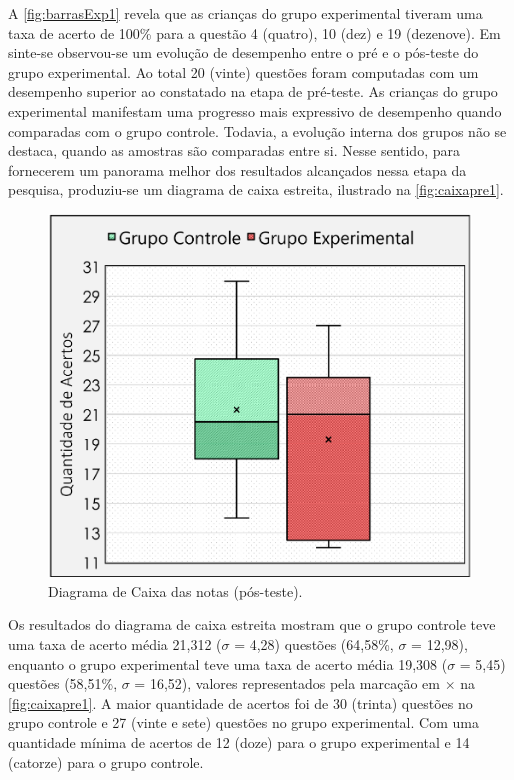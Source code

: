 A \autoref{fig:barrasExp1} revela que as crianças do grupo experimental tiveram uma taxa de acerto de 100\% para a questão 4 (quatro), 10 (dez) e 19 (dezenove).  Em sinte-se observou-se um evolução de desempenho entre o pré e o pós-teste do grupo experimental. Ao total 20 (vinte) questões foram computadas com um desempenho superior ao constatado na etapa de pré-teste.
As crianças do grupo experimental manifestam uma progresso mais expressivo de desempenho quando comparadas com o grupo controle. Todavia, a evolução interna dos grupos não se destaca, quando as amostras são comparadas entre si. Nesse sentido, para fornecerem um panorama melhor dos resultados alcançados nessa etapa da pesquisa, produziu-se um diagrama de caixa estreita, ilustrado na \autoref{fig:caixapre1}.

\begin{figure}%
    \vspace{-4pt}
    \caption{\label{fig:caixapre1}Diagrama de Caixa das notas (pós-teste).}
    \includegraphics[width=\linewidth]{./Visuais/CaixaEstreitaPOS.pdf}
\end{figure}

Os resultados do diagrama de caixa estreita mostram que o grupo controle teve uma taxa de acerto média 21,312 ($\sigma$ = 4,28) questões (64,58\%, $\sigma$ = 12,98), enquanto o grupo experimental teve uma taxa de acerto média 19,308 ($\sigma$ = 5,45) questões (58,51\%, $\sigma$ = 16,52), valores representados pela marcação em $\times$ na \autoref{fig:caixapre1}. A maior quantidade de acertos foi de 30 (trinta) questões no grupo controle e 27 (vinte e sete) questões no grupo experimental. Com uma quantidade mínima de acertos de 12 (doze) para o grupo experimental e 14 (catorze) para o grupo controle.

